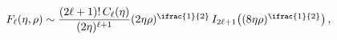 $\mathop{F_{\ell}\/}\nolimits\!\left(\eta,\rho\right)\sim\dfrac{(2\ell+1)!%
\mathop{C_{\ell}\/}\nolimits\!\left(\eta\right)}{(2\eta)^{\ell+1}}(2\eta\rho)^%
{\ifrac{1}{2}}\mathop{I_{2\ell+1}\/}\nolimits\!\left((8\eta\rho)^{\ifrac{1}{2}%
}\right),$
